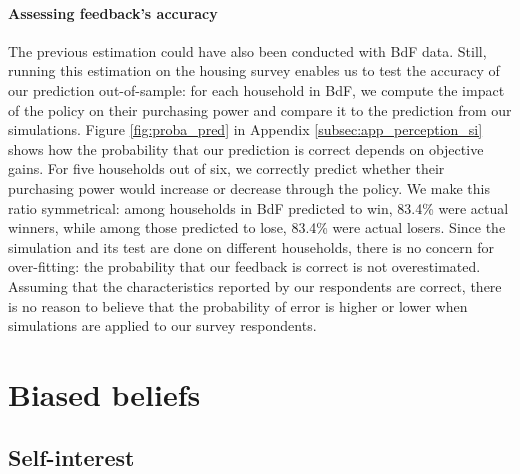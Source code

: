 \documentclass[12pt]{article} %
\begin{document}
\paragraph{Assessing feedback's accuracy}
The previous estimation could have also been conducted with BdF data. Still, running this estimation on the housing survey enables us to test the accuracy of our prediction out-of-sample: for each household in BdF, we compute the impact of the policy on their purchasing power and compare it to the prediction from our simulations. Figure \ref{fig:proba_pred} in Appendix \ref{subsec:app_perception_si} shows how the probability that our prediction is correct depends on objective gains. For five households out of six, we correctly predict whether their purchasing power would increase or decrease through the policy. We make this ratio symmetrical: among households in BdF predicted to win, 83.4\% were actual winners, while among those predicted to lose, 83.4\% were actual losers. Since the simulation and its test are done on different households, there is no concern for over-fitting: the probability that our feedback is correct is not overestimated. Assuming that the characteristics reported by our respondents are correct, there is no reason to believe that the probability of error is higher or lower when simulations are applied to our survey respondents.


\section{Biased beliefs}\label{sec:perceptions}

    \subsection{Self-interest}\label{subsec:perc_si}
\end{document}
